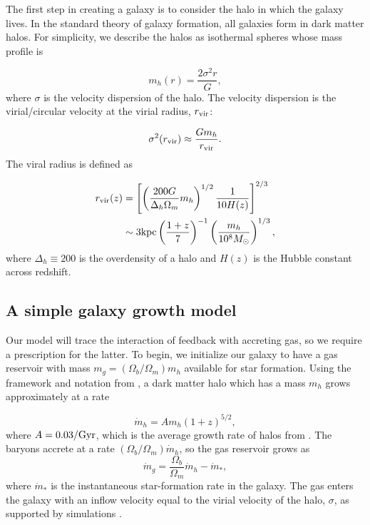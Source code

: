\documentclass[a4paper,11pt]{article}
\begin{document}
The first step in creating a galaxy is to consider the halo in which the galaxy lives. In the standard theory of galaxy formation, all galaxies form in dark matter halos. For simplicity, we describe the halos as isothermal spheres whose mass profile is

\begin{equation}
    m_{h}(r) = \frac{2 \sigma^{2} r}{G},
\end{equation}
%
where $\sigma$ is the velocity dispersion of the halo. The velocity dispersion is the virial/circular velocity at the virial radius, $r_{\rm vir}$:

\begin{equation}
    \sigma^{2} (r_{\rm vir}) \approx \frac{G m_{h}}{r_{\rm vir}}.
\end{equation}
%
The viral radius is defined as

\begin{equation}
\begin{split}
    r_{\rm vir} (z) & = \left[ \left( \frac{200 G}{\Delta_{h} \Omega_{m}} m_{h} \right)^{1/2} \frac{1}{10 H(z)} \right]^{2/3} \\
    & \sim 3 \mathrm{kpc} \left( \frac{1+z}{7} \right)^{-1} \left( \frac{m_{h}}{10^{8} M_{\odot{}}} \right)^{1/3},\label{eq:rvir}
\end{split}
\end{equation}
%
where $\Delta_{h} \equiv 200$ is the overdensity of a halo
and $H(z)$ is the Hubble constant across redshift. 

\subsection{A simple galaxy growth model} \label{sec:growth_model}

Our model will trace the interaction of feedback with accreting gas, so we require a prescription for the latter. To begin, we initialize our galaxy to have a gas reservoir with mass $m_{g}= (\Omega_{b}/\Omega_{m}) m_{h}$ available for star formation.
Using the framework and notation from \cite{Furlanetto2017_minimalist}, a dark matter halo which has a mass $m_{h}$ grows approximately at a rate

\begin{equation}
    \dot{m}_{h} = A m_{h} (1 + z)^{5/2}, \label{eq:dmh_dt}
\end{equation}
%
where $A = 0.03 / \rm Gyr$, which is the average growth rate of halos from \cite{Dekel2013}. The baryons accrete at a rate $(\Omega_{b}/\Omega_{m}) \dot{m}_{h}$, so the gas reservoir grows as
\begin{equation}
    \dot{m}_{g} = \frac{\Omega_{b}}{\Omega_{m}} \dot{m}_{h} - \dot{m}_{*},
\end{equation}
%
where $\dot{m}_{*}$ is the instantaneous star-formation rate in the galaxy. The gas enters the galaxy with an inflow velocity equal to the virial velocity of the halo, $\sigma$, as supported by simulations \cite{Dekel2009, Goerdt2015}.
\end{document}
